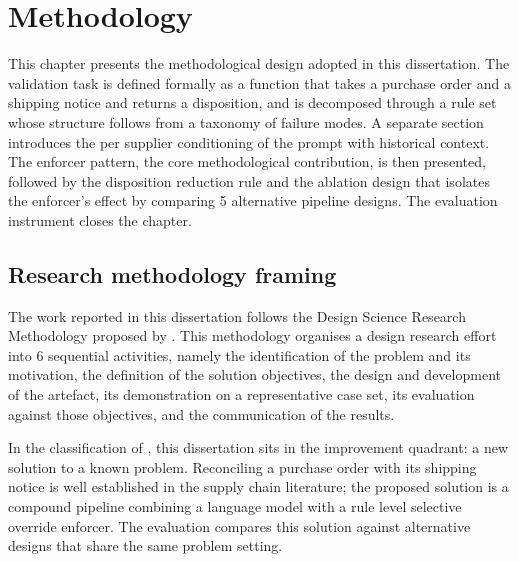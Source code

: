 
\chapter{Methodology} \label{chap:method}

This chapter presents the methodological design adopted in this dissertation. The validation task is defined formally as a function that takes a purchase order and a shipping notice and returns a disposition, and is decomposed through a rule set whose structure follows from a taxonomy of failure modes. A separate section introduces the per supplier conditioning of the prompt with historical context. The enforcer pattern, the core methodological contribution, is then presented, followed by the disposition reduction rule and the ablation design that isolates the enforcer's effect by comparing 5 alternative pipeline designs. The evaluation instrument closes the chapter.


\section{Research methodology framing}
\label{sec:method:framing}

The work reported in this dissertation follows the Design Science Research Methodology proposed by \citet{peffers2007dsrm}. This methodology organises a design research effort into 6 sequential activities, namely the identification of the problem and its motivation, the definition of the solution objectives, the design and development of the artefact, its demonstration on a representative case set, its evaluation against those objectives, and the communication of the results.

In the classification of \citet{gregor2013dsr}, this dissertation sits in the improvement quadrant: a new solution to a known problem. Reconciling a purchase order with its shipping notice is well established in the supply chain literature; the proposed solution is a compound pipeline combining a language model with a rule level selective override enforcer. The evaluation compares this solution against alternative designs that share the same problem setting.


